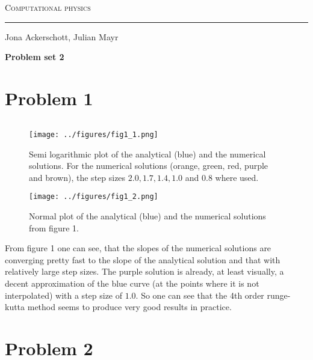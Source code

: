 \documentclass[12pt,a4paper]{article}
\newenvironment{code}{\captionsetup{type=listing}}{}
\begin{document}
\centerline{\Huge\scshape Computational physics}
\vspace*{0.5cm}
\hrule
\vspace*{0.5cm}
\centerline{Jona Ackerschott, Julian Mayr}
\vspace*{1cm}
\centerline{\Large\bfseries Problem set 2}
\vspace*{0.5cm}

\section*{Problem 1}

\begin{code}
	\inputminted{python}{../problem1.py}
\end{code}

\begin{figure}[h]
	\texttt{[image: ../figures/fig1\_1.png]}
	\caption{Semi logarithmic plot of the analytical (blue) and the numerical solutions. For the numerical 	solutions (orange, green, red, purple and brown), the step sizes $2.0, 1.7, 1.4, 1.0$ and $0.8$ where 		used.}
\end{figure}
\begin{figure}[ht]
	\texttt{[image: ../figures/fig1\_2.png]}
	\caption{Normal plot of the analytical (blue) and the numerical solutions from figure 1.}
\end{figure}

\newpage

\noindent
From figure 1 one can see, that the slopes of the numerical solutions are converging pretty fast to the slope of the analytical solution and that with relatively large step sizes. The purple solution is already, at least visually, a decent approximation of the blue curve (at the points where it is not interpolated) with a step size of $1.0$. So one can see that the 4th order runge-kutta method seems to produce very good results in practice.

\section*{Problem 2}
\begin{code}
	\inputminted{python}{../problem2.py}
\end{code}
\end{document}
